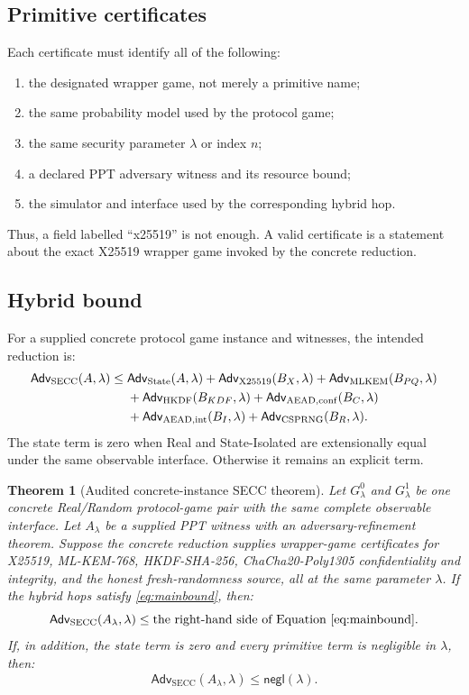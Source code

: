 \documentclass[11pt,letterpaper]{article}
\newtheorem{theorem}[definition]{Theorem}
\newcommand{\Adv}{\mathsf{Adv}}
\newcommand{\negl}{\mathsf{negl}}
\begin{document}
\subsection{Primitive certificates}

Each certificate must identify all of the following:
\begin{enumerate}[leftmargin=*]
  \item the designated wrapper game, not merely a primitive name;
  \item the same probability model used by the protocol game;
  \item the same security parameter $\lambda$ or index $n$;
  \item a declared PPT adversary witness and its resource bound;
  \item the simulator and interface used by the corresponding hybrid hop.
\end{enumerate}

Thus, a field labelled ``x25519'' is not enough. A valid certificate is a statement about
the exact X25519 wrapper game invoked by the concrete reduction.

\subsection{Hybrid bound}

For a supplied concrete protocol game instance and witnesses, the intended reduction is:
\begin{align}
  \Adv_{\mathrm{SECC}}(A,\lambda)
  \leq{}&\Adv_{\mathrm{State}}(A,\lambda)
  +\Adv_{\mathrm{X25519}}(B_X,\lambda)
  +\Adv_{\mathrm{MLKEM}}(B_{PQ},\lambda) \notag\\
  &+\Adv_{\mathrm{HKDF}}(B_{KDF},\lambda)
  +\Adv_{\mathrm{AEAD,conf}}(B_C,\lambda) \notag\\
  &+\Adv_{\mathrm{AEAD,int}}(B_I,\lambda)
  +\Adv_{\mathrm{CSPRNG}}(B_R,\lambda).
  \label{eq:mainbound}
\end{align}
The state term is zero when Real and State-Isolated are extensionally equal under the
same observable interface. Otherwise it remains an explicit term.

\begin{theorem}[Audited concrete-instance SECC theorem]
\label{thm:secc}
Let $G^0_\lambda$ and $G^1_\lambda$ be one concrete Real/Random protocol-game pair with
the same complete observable interface. Let $A_\lambda$ be a supplied PPT witness with an
adversary-refinement theorem. Suppose the concrete reduction supplies wrapper-game
certificates for X25519, ML-KEM-768, HKDF-SHA-256, ChaCha20-Poly1305 confidentiality and
integrity, and the honest fresh-randomness source, all at the same parameter $\lambda$.
If the hybrid hops satisfy \cref{eq:mainbound}, then:
\[
  \Adv_{\mathrm{SECC}}(A_\lambda,\lambda)
  \leq \text{the right-hand side of Equation~\eqref{eq:mainbound}}.
\]
If, in addition, the state term is zero and every primitive term is negligible in
$\lambda$, then:
\[
  \Adv_{\mathrm{SECC}}(A_\lambda,\lambda)\leq \negl(\lambda).
\]
\end{theorem}
\end{document}
